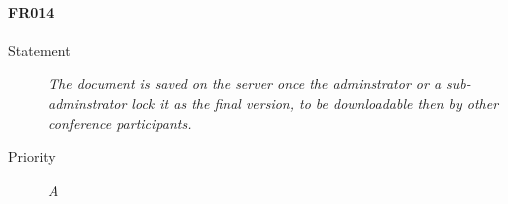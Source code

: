 \paragraph{FR014}
\begin{description}
  \item [Statement] 
  \textit{ The document is saved on the server once the adminstrator or a sub-adminstrator lock it as the final version, to be downloadable then by other conference participants.}
\item [Priority] \textit{A}
\end{description}
